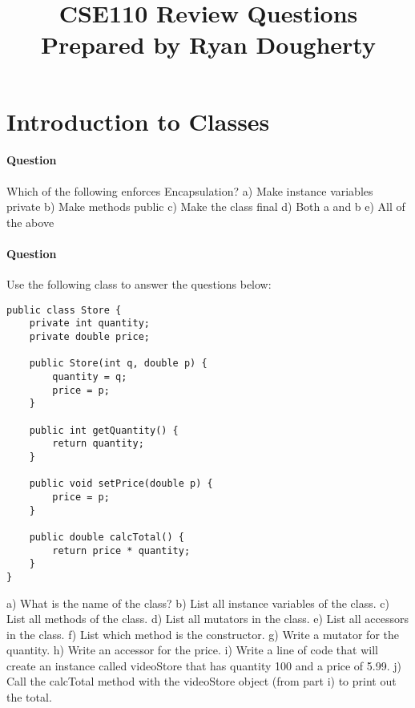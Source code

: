 \documentclass{article}
\date{}
\begin{document}
\title{\textbf{CSE110 Review Questions \\
Prepared by Ryan Dougherty}}
\maketitle

\section*{Introduction to Classes}


\setcounter{question_num}{1}
\paragraph{Question }
Which of the following enforces Encapsulation?
\newline a) Make instance variables private
\newline b) Make methods public
\newline c) Make the class final
\newline d) Both a and b
\newline e) All of the above

\addtocounter{question_num}{1}
\paragraph{Question }
Use the following class to answer the questions below:
\begin{lstlisting}
public class Store {
	private int quantity;
	private double price;

	public Store(int q, double p) {
		quantity = q;
		price = p;
	}

	public int getQuantity() {
		return quantity;
	}

	public void setPrice(double p) {
		price = p;
	}

	public double calcTotal() {
		return price * quantity;
	}
}
\end{lstlisting}
a) What is the name of the class?
\newline b) List all instance variables of the class.
\newline c) List all methods of the class.
\newline d) List all mutators in the class.
\newline e) List all accessors in the class.
\newline f) List which method is the constructor.
\newline g) Write a mutator for the quantity.
\newline h) Write an accessor for the price.
\newline i) Write a line of code that will create an instance called videoStore that has quantity 100 and a price of 5.99.
\newline j) Call the calcTotal method with the videoStore object (from part i) to print out the total.
\end{document}
